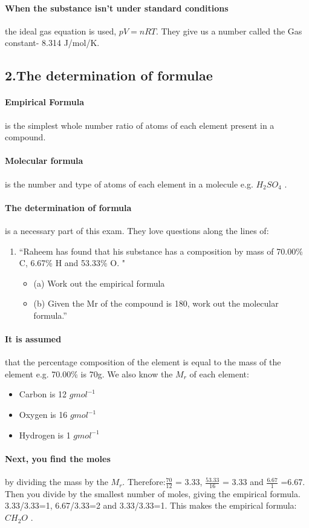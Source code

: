 \paragraph{When the substance isn’t under standard conditions} the ideal gas equation is used, \(pV=nRT\). They give us a number called the Gas constant- 8.314 J/mol/K.
\subsection{2.The determination of formulae}
\paragraph{Empirical Formula} is the simplest whole number ratio of atoms of each element present in a compound.
\paragraph{Molecular formula} is the number and type of atoms of each element in a molecule e.g. \(H_2SO_4\) .
\paragraph{The determination of formula} is a necessary part of this exam. They love questions along the lines of:
\begin{enumerate}
\item “Raheem has found that his substance has a composition by mass of 70.00\% C, 6.67\% H and 53.33\% O. "
\begin{itemize}
\item (a) Work out the empirical formula
\item (b) Given the Mr of the compound is 180, work out the molecular formula.”
\end{itemize}
\end{enumerate}
\paragraph{It is assumed} that the percentage composition of the element is equal to the mass of the element e.g. 70.00\% is 70g. We also know the \(M_r\) of each element:
\begin{itemize}
\item Carbon is 12 \(gmol^{-1}\)
\item Oxygen is 16 \(gmol^{-1}\)
\item Hydrogen is 1 \(gmol^{-1}\)
\end{itemize}
\paragraph{Next, you find the moles} by dividing the mass by the \(M_r\). 
\newline Therefore:\(\frac{70}{12}\) = 3.33, \(\frac{53.33}{16}\) = 3.33 and \(\frac{6.67}{1}\) =6.67. Then you divide by the smallest number of moles, giving the empirical formula. 3.33/3.33=1, 6.67/3.33=2 and 3.33/3.33=1. This makes the empirical  formula: \(CH_2O\) .
